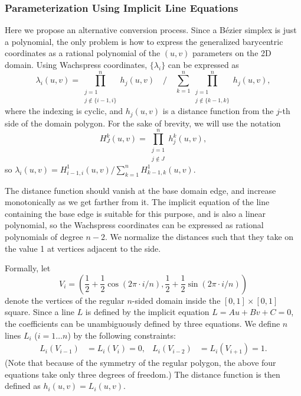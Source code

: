 \documentclass[9pt,academicons]{article}
\begin{document}
\subsubsection{Parameterization Using Implicit Line Equations}
\label{subsubsec:parameters}
Here we propose an alternative conversion process. Since a B\'ezier simplex is just a polynomial,
the only problem is how to express the generalized barycentric coordinates as a rational polynomial
of the $(u,v)$ parameters on the 2D domain. Using Wachspress coordinates,
$\{\lambda_i\}$ can be expressed as
\begin{equation}
  \label{eq:wachspress}
  \lambda_i(u,v) = \prod_{\substack{j=1\\j\notin\{i-1,i\}}}^nh_j(u,v) \quad\bigg/\quad
                   \sum_{k=1}^n\prod_{\substack{j=1\\j\notin\{k-1,k\}}}^nh_j(u,v),
\end{equation}
where the indexing is cyclic, and $h_j(u,v)$ is a distance function
from the $j$-th side of the domain polygon. For the sake of brevity,
we will use the notation
\begin{equation}
  H_J^k(u,v)=\prod_{\substack{j=1\\j\notin{J}}}^nh_j^k(u,v),
\end{equation}
so $\lambda_i(u,v)=H_{i-1,i}^1(u,v)/\sum_{k=1}^nH_{k-1,k}^1(u,v)$.

The distance function should vanish at the base domain edge, and increase monotonically
as we get farther from it.
The implicit
equation of the line containing the base edge is suitable for this purpose,
and is also a linear polynomial,
so the Wachspress coordinates can be expressed as rational polynomials of degree $n-2$. We
normalize the distances such that they take on the value 1 at vertices adjacent to the side.

Formally, let
\begin{equation}
  V_i=\left(\frac{1}{2}+\frac{1}{2}\cos(2\pi\cdot i/n),
            \frac{1}{2}+\frac{1}{2}\sin(2\pi\cdot i/n)\right)
\end{equation}
denote the vertices of the regular $n$-sided domain inside the $[0,1]\times[0,1]$ square.
Since a line $L$ is defined by the implicit equation $L=Au+Bv+C=0$, the coefficients can
be unambiguously defined by three equations. We define $n$ lines
$L_i$ ($i=1\dots n$) by the following constraints:
\begin{align}
  L_i(V_{i-1})&=L_i(V_i)=0, & L_i(V_{i-2})&=L_i(V_{i+1})=1.
\end{align}
(Note that because of the symmetry of the regular polygon, the above four equations take
only three degrees of freedom.) The distance function is then defined as $h_i(u,v)=L_i(u,v)$.
\end{document}
